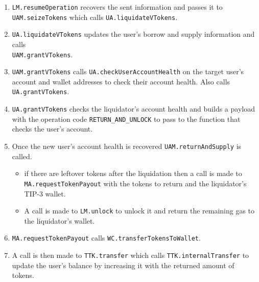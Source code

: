 \begin{enumerate}
\begin{enumerate}
  \end{enumerate}
  \item \verb|LM.resumeOperation| recovers the sent information and passes it to \verb|UAM.seizeTokens| which calls \verb|UA.liquidateVTokens|.
  \item \verb|UA.liquidateVTokens| updates the user's borrow and supply information and calls \\\verb|UAM.grantVTokens|.
  \item \verb|UAM.grantVTokens| calls \verb|UA.checkUserAccountHealth| on the target user's account and wallet addresses to check their account health. Also calls \verb|UA.grantVTokens|.
  \item \verb|UA.grantVTokens| checks the liquidator's account health and builds a payload with the operation code \verb|RETURN_AND_UNLOCK| to pass to the function that checks the user's account.
  \item Once the new user's account health is recovered \verb|UAM.returnAndSupply| is called.
  \begin{itemize}
    \item if there are leftover tokens after the liquidation then a call is made to \\\verb|MA.requestTokenPayout| with the tokens to return and the liquidator's TIP-3 wallet.
    \item A call is made to \verb|LM.unlock| to unlock it and return the remaining gas to the liquidator's wallet.
  \end{itemize}
  \item \verb|MA.requestTokenPayout| calls \verb|WC.transferTokensToWallet|.
  \item A call is then made to \verb|TTK.transfer| which calls \verb|TTK.internalTransfer| to update the user's balance by increasing it with the returned amount of tokens.
\end{enumerate}
